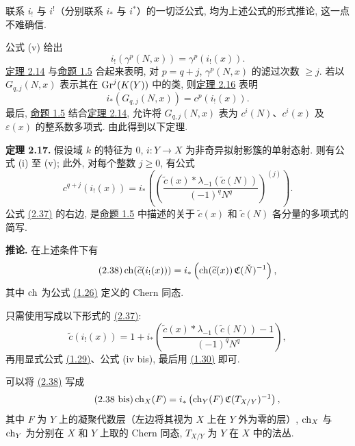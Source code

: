联系 $i_!$ 与 $i^!$（分别联系 $i_*$ 与 $i^*$）的一切泛公式, 均为上述公式的形式推论, 这一点不难确信.

公式 (v) 给出
\[
 i_!(\gamma^p(N,x))=\gamma^p(i_!(x)).
\]
\hyperlink{sga6.e00.thm.2-14}{定理 2.14} 与\hyperlink{sga6.e00.prop.1-5}{命题 1.5} 合起来表明, 对 $p=q+j$, $\gamma^p(N,x)$ 的滤过次数 $\geq j$. 若以 $G_{q,j}(N,x)$ 表示其在 $\operatorname{Gr}^j(K(Y))$ 中的类, 则\hyperlink{sga6.e00.thm.2-16}{定理 2.16} 表明
\[
 i_*(G_{q,j}(N,x))=c^p(i_!(x)).
\]
最后, \hyperlink{sga6.e00.prop.1-5}{命题 1.5} 结合\hyperlink{sga6.e00.thm.2-14}{定理 2.14}, 允许将 $G_{q,j}(N,x)$ 表为 $c^i(N)$、$c^i(x)$ 及 $\varepsilon(x)$ 的整系数多项式. 由此得到以下定理.

\textbf{定理 2.17.} 假设域 $k$ 的特征为 $0$, $i:Y\to X$ 为非奇异拟射影簇的单射态射. 则有公式 (i) 至 (v); 此外, 对每个整数 $j\geq 0$, 有公式
\begin{equation}\tag{2.37}
 c^{q+j}(i_!(x))=
 i_*\left(\left(\frac{\widetilde c(x)*\lambda_{-1}(\widetilde c(N))}{(-1)^qN^q}\right)^{(j)}\right).
\end{equation}
公式 \hyperlink{sga6.e00.eq.2-37}{(2.37)} 的右边, 是\hyperlink{sga6.e00.prop.1-5}{命题 1.5} 中描述的关于 $\widetilde c(x)$ 和 $\widetilde c(N)$ 各分量的多项式的简写.

\textbf{推论.} 在上述条件下有
\begin{equation}\tag{2.38}
 \operatorname{ch}(\widetilde c(i_!(x)))=i_*\left(\operatorname{ch}(\widetilde c(x))\,\mathfrak C(\check N)^{-1}\right),
\end{equation}
其中 $\operatorname{ch}$ 为公式 \hyperlink{sga6.e00.eq.1-26}{(1.26)} 定义的 Chern 同态.

只需使用写成以下形式的 \hyperlink{sga6.e00.eq.2-37}{(2.37)}:
\begin{equation}\tag{2.37 bis}
 \widetilde c(i_!(x))=1+i_*\left(\frac{\widetilde c(x)*\lambda_{-1}(\widetilde c(N))-1}{(-1)^qN^q}\right),
\end{equation}
再用显式公式 \hyperlink{sga6.e00.eq.1-29}{(1.29)}、公式 (iv bis), 最后用 \hyperlink{sga6.e00.eq.1-30}{(1.30)} 即可.

可以将 \hyperlink{sga6.e00.eq.2-38}{(2.38)} 写成
\begin{equation}\tag{2.38 bis}
 \operatorname{ch}_X(F)=i_*\left(\operatorname{ch}_Y(F)\,\mathfrak C(T_{X/Y})^{-1}\right),
\end{equation}
其中 $F$ 为 $Y$ 上的凝聚代数层（左边将其视为 $X$ 上在 $Y$ 外为零的层）, $\operatorname{ch}_X$ 与 $\operatorname{ch}_Y$ 为分别在 $X$ 和 $Y$ 上取的 Chern 同态, $T_{X/Y}$ 为 $Y$ 在 $X$ 中的法丛.


